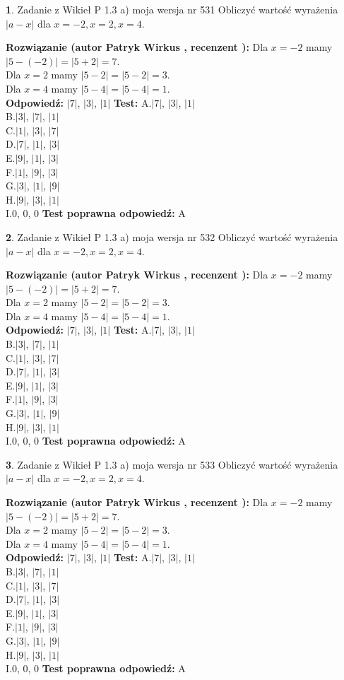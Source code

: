 \documentclass[12pt, a4paper]{article}
\theoremstyle{definition} %
\newtheorem{zad}{}
\newcommand{\zadStart}[1]{\begin{zad}#1\newline}
\newcommand{\zadStop}{\end{zad}}
\newcommand{\rozwStart}[2]{\noindent \textbf{Rozwiązanie (autor #1 , recenzent #2): }\newline}
\newcommand{\rozwStop}{\newline}
\newcommand{\odpStart}{\noindent \textbf{Odpowiedź:}\newline}
\newcommand{\odpStop}{\newline}
\newcommand{\testStart}{\noindent \textbf{Test:}\newline}
\newcommand{\testStop}{\newline}
\newcommand{\kluczStart}{\noindent \textbf{Test poprawna odpowiedź:}\newline}
\newcommand{\kluczStop}{\newline}
\begin{document}
\zadStart{Zadanie z Wikieł P 1.3 a) moja wersja nr 531}
Obliczyć wartość wyrażenia $|a - x|$ dla $x=-2,x=2,x=4$.
\zadStop
\rozwStart{Patryk Wirkus}{}
Dla $x = -2$ mamy $|5 - (-2)| = |5 + 2| = 7$.\\
Dla $x = 2$ mamy $|5 - 2| = |5 - 2| = 3$.\\
Dla $x = 4$ mamy $|5 - 4| = |5 - 4| = 1$.\\
\rozwStop
\odpStart
$|7|$, $|3|$, $|1|$
\odpStop
\testStart
A.$|7|$, $|3|$, $|1|$\\
B.$|3|$, $|7|$, $|1|$\\
C.$|1|$, $|3|$, $|7|$\\
D.$|7|$, $|1|$, $|3|$\\
E.$|9|$, $|1|$, $|3|$\\
F.$|1|$, $|9|$, $|3|$\\
G.$|3|$, $|1|$, $|9|$\\
H.$|9|$, $|3|$, $|1|$\\
I.$0$, $0$, $0$
\testStop
\kluczStart
A
\kluczStop



\zadStart{Zadanie z Wikieł P 1.3 a) moja wersja nr 532}
Obliczyć wartość wyrażenia $|a - x|$ dla $x=-2,x=2,x=4$.
\zadStop
\rozwStart{Patryk Wirkus}{}
Dla $x = -2$ mamy $|5 - (-2)| = |5 + 2| = 7$.\\
Dla $x = 2$ mamy $|5 - 2| = |5 - 2| = 3$.\\
Dla $x = 4$ mamy $|5 - 4| = |5 - 4| = 1$.\\
\rozwStop
\odpStart
$|7|$, $|3|$, $|1|$
\odpStop
\testStart
A.$|7|$, $|3|$, $|1|$\\
B.$|3|$, $|7|$, $|1|$\\
C.$|1|$, $|3|$, $|7|$\\
D.$|7|$, $|1|$, $|3|$\\
E.$|9|$, $|1|$, $|3|$\\
F.$|1|$, $|9|$, $|3|$\\
G.$|3|$, $|1|$, $|9|$\\
H.$|9|$, $|3|$, $|1|$\\
I.$0$, $0$, $0$
\testStop
\kluczStart
A
\kluczStop



\zadStart{Zadanie z Wikieł P 1.3 a) moja wersja nr 533}
Obliczyć wartość wyrażenia $|a - x|$ dla $x=-2,x=2,x=4$.
\zadStop
\rozwStart{Patryk Wirkus}{}
Dla $x = -2$ mamy $|5 - (-2)| = |5 + 2| = 7$.\\
Dla $x = 2$ mamy $|5 - 2| = |5 - 2| = 3$.\\
Dla $x = 4$ mamy $|5 - 4| = |5 - 4| = 1$.\\
\rozwStop
\odpStart
$|7|$, $|3|$, $|1|$
\odpStop
\testStart
A.$|7|$, $|3|$, $|1|$\\
B.$|3|$, $|7|$, $|1|$\\
C.$|1|$, $|3|$, $|7|$\\
D.$|7|$, $|1|$, $|3|$\\
E.$|9|$, $|1|$, $|3|$\\
F.$|1|$, $|9|$, $|3|$\\
G.$|3|$, $|1|$, $|9|$\\
H.$|9|$, $|3|$, $|1|$\\
I.$0$, $0$, $0$
\testStop
\kluczStart
A
\kluczStop
\end{document}
